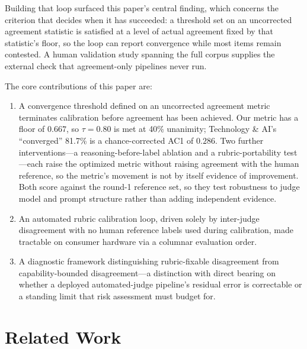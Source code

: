 \documentclass[letterpaper]{article}
\begin{document}
Building that loop surfaced this paper's central finding, which concerns the
criterion that decides when it has succeeded: a threshold set on an
uncorrected agreement statistic is satisfied at a level of actual agreement
fixed by that statistic's floor, so the loop can report convergence while most
items remain contested. A human validation study spanning the full corpus
supplies the external check that agreement-only pipelines never run.

The core contributions of this paper are:
\begin{enumerate}
\item A convergence threshold defined on an uncorrected agreement metric
      terminates calibration before agreement has been achieved. Our metric
      has a floor of $0.667$, so $\tau = 0.80$ is met at 40\% unanimity;
      Technology \& AI's ``converged'' 81.7\% is a chance-corrected
      AC1 of $0.286$. Two further interventions---a
      reasoning-before-label ablation and a rubric-portability test---each
      raise the optimized metric without raising agreement with the human
      reference, so the metric's movement is not by itself evidence of
      improvement. Both score against the round-1 reference set, so they
      test robustness to judge model and prompt structure rather than adding
      independent evidence.
\item An automated rubric calibration loop, driven solely by inter-judge
      disagreement with no human reference labels used during calibration,
      made tractable on consumer hardware via a columnar evaluation order.
\item A diagnostic framework distinguishing rubric-fixable disagreement
      from capability-bounded disagreement---a distinction with direct
      bearing on whether a deployed automated-judge pipeline's residual
      error is correctable or a standing limit that risk assessment must
      budget for.
\end{enumerate}

\section{Related Work}
\end{document}
